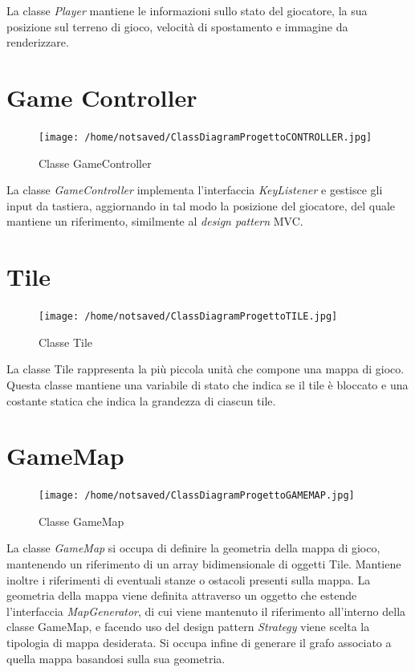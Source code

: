 \documentclass[12pt]{book}
\begin{document}
La classe \emph{Player} mantiene le informazioni sullo stato del giocatore, la sua posizione sul terreno di gioco, velocit\`a di spostamento e immagine da renderizzare.

\section{Game Controller}
\begin{figure}[H]
\centering
\texttt{[image: /home/notsaved/ClassDiagramProgettoCONTROLLER.jpg]}
\caption{Classe GameController}
\label{gameController}
\end{figure}

La classe \emph{GameController} implementa l'interfaccia \emph{KeyListener} e gestisce gli input da tastiera, aggiornando in tal modo la posizione del giocatore, del quale mantiene un riferimento, similmente al \emph{design pattern} MVC.

\section{Tile}
\begin{figure}[H]
\centering
\texttt{[image: /home/notsaved/ClassDiagramProgettoTILE.jpg]}
\caption{Classe Tile}
\label{clssTile}
\end{figure}

La classe Tile rappresenta la pi\`u piccola unit\`a che compone una mappa di gioco. Questa classe mantiene una variabile di stato che indica se il tile \`e bloccato e una costante statica che indica la grandezza di ciascun tile.

\section{GameMap}
\begin{figure}[H]
\centering
\texttt{[image: /home/notsaved/ClassDiagramProgettoGAMEMAP.jpg]}
\caption{Classe GameMap}
\label{gamemap}
\end{figure}

La classe \emph{GameMap} si occupa di definire la geometria della mappa di gioco, mantenendo un riferimento di un array bidimensionale di oggetti Tile. Mantiene inoltre i riferimenti di eventuali stanze o ostacoli presenti sulla mappa. La geometria della mappa viene definita attraverso un oggetto che estende l'interfaccia \emph{MapGenerator}, di cui viene mantenuto il riferimento all'interno della classe GameMap, e facendo uso del design pattern \emph{Strategy} viene scelta la tipologia di mappa desiderata. Si occupa infine di generare il grafo associato a quella mappa basandosi sulla sua geometria.
\end{document}
